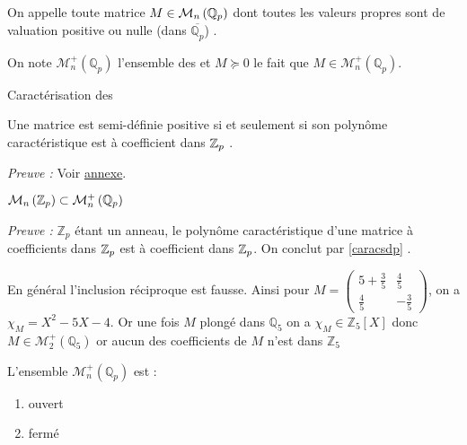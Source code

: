 \subsection{\Mats} 

\begin{definition}
	On appelle \emp{\mat} toute matrice $M \in \mathcal{M}_n\left( \mathbb{Q}_p \right) $ dont toutes les valeurs propres sont de valuation positive ou nulle (dans $\overline{\mathbb{Q}_{p}}$) .

	On note $ \mathcal{M}_n^+\left( \mathbb{Q}_p \right)$ l'ensemble des \mats et $M \succeq 0$ le fait que $M \in \mathcal{M}_n^+\left( \mathbb{Q}_{p}\right) $.
\end{definition}
\begin{theoreme}
	\label{caracsdp}
	Caractérisation des \mats

	Une matrice est semi-définie positive si et seulement si son polynôme caractéristique est à coefficient dans $ \mathbb {Z}_p $ .
	
\end{theoreme}
	\textit{Preuve :} Voir \hyperlink{caracsdppreuve}{annexe}.  

\begin{consequence}
	$\mathcal{M}_n \left(  \mathbb {Z}_p  \right) \subset \mathcal{M}_n^+\left( \mathbb{Q}_p \right)$ 
\end{consequence}

\textit{Preuve : }  $\mathbb{Z}_p$ étant un anneau, le polynôme caractéristique d'une matrice à coefficients dans $ \mathbb {Z}_p $ est à coefficient dans $ \mathbb {Z}_p $. On conclut par \ref{caracsdp} .

\begin{remarque}
	En général l'inclusion réciproque est fausse. Ainsi pour $M = \begin{pmatrix} 5 + \frac{3}{5} & \frac{4}{5} \\ \frac{4}{5} & -\frac{3}{5} \end{pmatrix} $, on a $\chi_M = X^2  - 5 X - 4$. Or une fois $M$ plongé dans $\mathbb{Q}_5$ on a $\chi_M \in \mathbb{Z}_5[X]$ donc $M \in \mathcal{M}_2^+\left( \mathbb{Q}_5 \right)$ or aucun des coefficients de $M$ n'est dans $\mathbb{Z}_5 $
\end{remarque}

\begin{propriete}
	L'ensemble $\mathcal{M}_n^+\left( \mathbb{Q}_p \right)$  est :
	\begin{enumerate}[label = \textit{\roman*}.]
		\item ouvert
		\item fermé
	\end{enumerate}
\end{propriete}

